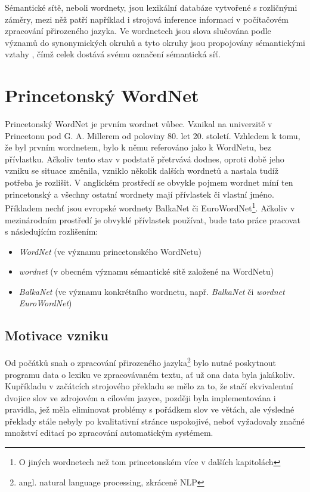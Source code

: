 \documentclass[a4paper, 11pt, oneside]{book}
\begin{document}
		Sémantické sítě, neboli wordnety, jsou lexikální databáze vytvořené s rozličnými záměry, mezi něž patří například i strojová inference informací v počítačovém zpracování přirozeného jazyka. Ve wordnetech jsou slova slučována podle významů do synonymických okruhů a tyto okruhy jsou propojovány sémantickými vztahy \parencite{pala2013vceska, princetonWN}, čímž celek dostává svému označení sémantická síť.

		\chapter{Princetonský WordNet} %
		\label{cha:princeton_wn}
		
			Princetonský WordNet je prvním wordnet vůbec. Vznikal na univerzitě v Princetonu pod G. A. Millerem od poloviny 80. let 20. století. Vzhledem k tomu, že byl prvním wordnetem, bylo k němu referováno jako k WordNetu, bez přívlastku. Ačkoliv tento stav v podstatě přetrvává dodnes, oproti době jeho vzniku se situace změnila, vzniklo několik dalších wordnetů a nastala tudíž potřeba je rozlišit. V anglickém prostředí se obvykle pojmem wordnet míní ten princetonský a všechny ostatní wordnety mají přívlastek či vlastní jméno. Příkladem nechť jsou evropské wordnety BalkaNet či EuroWordNet\footnote{O jiných wordnetech než tom princetonském více v dalších kapitolách}. Ačkoliv v mezinárodním prostředí je obvyklé přívlastek  používat, bude tato práce pracovat s následujícím rozlišením:

			\begin{itemize}
				\item \textit{WordNet} (ve významu princetonského WordNetu)
				\item \textit{wordnet} (v obecném významu sémantické sítě založené na WordNetu)
				\item \textit{BalkaNet} (ve významu konkrétního wordnetu, např. \textit{BalkaNet} či \textit{wordnet EuroWordNet})
			\end{itemize}

			\section{Motivace vzniku}
				Od počátků snah o zpracování přirozeného jazyka\footnote{angl. natural language processing, zkráceně NLP} bylo nutné poskytnout programu data o lexiku ve zpracovávaném textu, ať už ona data byla jakákoliv. Kupříkladu v začátcích strojového překladu se mělo za to, že stačí ekvivalentní dvojice slov ve zdrojovém a cílovém jazyce, později byla implementována i pravidla, jež měla eliminovat problémy s pořádkem slov ve větách, ale výsledné překlady stále nebyly po kvalitativní stránce uspokojivé, neboť vyžadovaly značné množství editací po zpracování automatickým systémem. \parencite{hutchins1982evolution}
\end{document}
